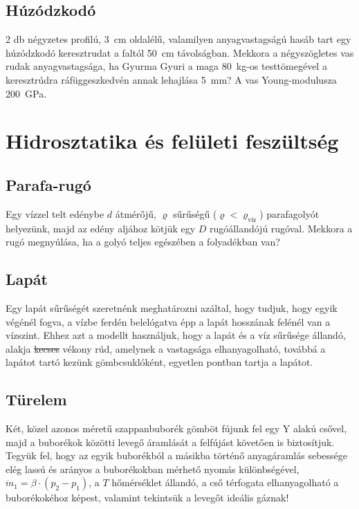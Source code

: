 \documentclass[12pt,a4paper]{scrartcl}
\begin{document}
\subsection{Húzódzkodó}
2 db négyzetes profilú, \SI{3}{cm} oldalélű, valamilyen anyagvastagságú hasáb tart egy húzódzkodó keresztrudat a faltól \SI{50}{cm} távolságban. Mekkora a négyszögletes vas rudak anyagvastagsága, ha Gyurma Gyuri a maga \SI{80}{kg}-os testtömegével a keresztrúdra ráfüggeszkedvén annak lehajlása \SI{5}{mm}? A vas Young-modulusza \SI{200}{GPa}.

\section{Hidrosztatika és felületi feszültség}
\subsection{Parafa-rugó}
Egy vízzel telt edénybe $d$ átmérőjű, $\varrho$ sűrűségű ($\varrho<\varrho_{\text{víz}}$) parafagolyót helyezünk, majd az edény aljához kötjük egy $D$ rugóállandójú rugóval. Mekkora a rugó megnyúlása, ha a golyó teljes egészében a folyadékban van?


\subsection{Lapát}
Egy lapát sűrűségét szeretnénk meghatározni azáltal, hogy tudjuk, hogy egyik végénél fogva, a vízbe ferdén belelógatva épp a lapát hosszának felénél van a vízszint. Ehhez azt a modellt használjuk, hogy a lapát és a víz sűrűsége állandó, alakja \sout{kecses} vékony rúd, amelynek a vastagsága elhanyagolható, továbbá a lapátot tartó kezünk gömbcsuklóként, egyetlen pontban tartja a lapátot.

\subsection{Türelem}
Két, közel azonos méretű szappanbuborék gömböt fújunk fel egy Y alakú csővel, majd a buborékok közötti levegő áramlását a felfújást követően is biztosítjuk. Tegyük fel, hogy az egyik buborékból a másikba történő anyagáramlás sebessége elég lassú és arányos a buborékokban mérhető nyomás különbségével, ${\dot m_1} = \beta  \cdot \left( {{p_2} - {p_1}} \right)$, a $T$ hőmérséklet állandó, a cső térfogata elhanyagolható a buborékokéhoz képest, valamint tekintsük a levegőt ideális gáznak! 
\end{document}

